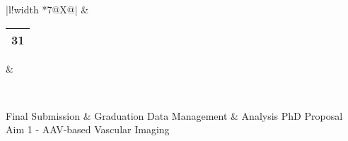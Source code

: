 {\begin{tabularx}{\linewidth}{|l!{\vrule width \myLenLineThicknessThick}*{7}{@{}X@{}|}}
       & 
    
      
      
        \begin{tabular}{@{}p{6mm}@{}|}\raggedright{}31\\ \hline\end{tabular}
      
       & 
    
      
      
      
        \\  \hline 
      
    
  
  
  \end{tabularx}
}
\vfill{\centering{} \small{Final Submission \& Graduation}\hspace{1.5em} \small{Data Management \& Analysis}\hspace{1.5em} \small{PhD Proposal}\hspace{1.5em} \small{Aim 1 - AAV-based Vascular Imaging}\hspace{1.5em}\par}

